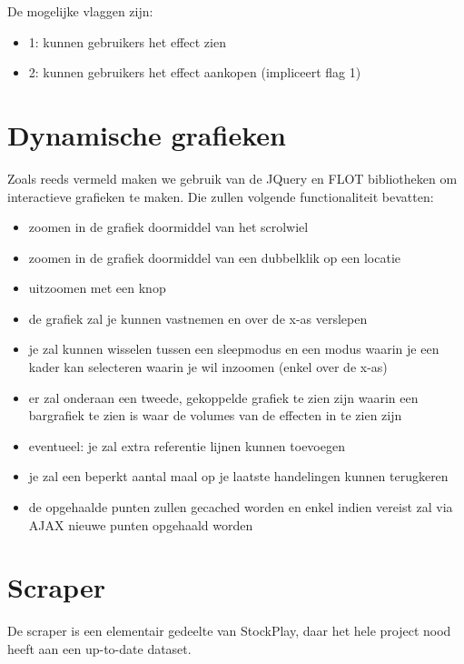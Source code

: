 De mogelijke vlaggen zijn:
\begin{itemize}
\item{1: kunnen gebruikers het effect zien}
\item{2: kunnen gebruikers het effect aankopen (impliceert flag 1)}
\end{itemize}


%
%


\chapter{Dynamische grafieken}

Zoals reeds vermeld maken we gebruik van de JQuery en FLOT bibliotheken om interactieve grafieken te maken. Die zullen volgende functionaliteit bevatten:
\begin{itemize}
\item{zoomen in de grafiek doormiddel van het scrolwiel}
\item{zoomen in de grafiek doormiddel van een dubbelklik op een locatie}
\item{uitzoomen met een knop}
\item{de grafiek zal je kunnen vastnemen en over de x-as verslepen}
\item{je zal kunnen wisselen tussen een sleepmodus en een modus waarin je een kader kan selecteren waarin je wil inzoomen (enkel over de x-as)}
\item{er zal onderaan een tweede, gekoppelde grafiek te zien zijn waarin een bargrafiek te zien is waar de volumes van de effecten in te zien zijn}
\item{eventueel: je zal extra referentie lijnen kunnen toevoegen}
\item{je zal een beperkt aantal maal op je laatste handelingen kunnen terugkeren}
\item{de opgehaalde punten zullen gecached worden en enkel indien vereist zal via AJAX nieuwe punten opgehaald worden}
\end{itemize}


%
%

\chapter{Scraper}

De scraper is een elementair gedeelte van StockPlay, daar het hele project nood heeft aan een up-to-date dataset.

